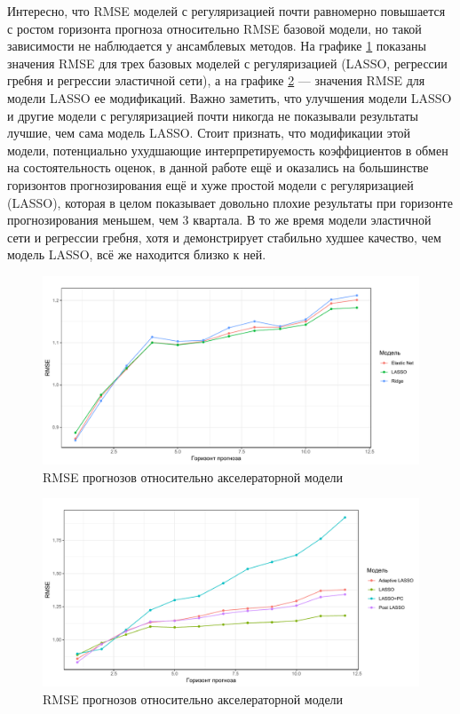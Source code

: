 Интересно, что RMSE моделей с регуляризацией почти равномерно повышается с ростом горизонта прогноза относительно RMSE базовой модели, но такой зависимости не наблюдается у ансамблевых методов. На графике \ref{fig:rmse1} показаны значения RMSE для трех базовых моделей с регуляризацией (LASSO, регрессии гребня и регрессии эластичной сети), а на графике \ref{fig:rmse2} --- значения RMSE для модели LASSO ее модификаций. Важно заметить, что улучшения модели LASSO и другие модели с регуляризацией почти никогда не показывали результаты лучшие, чем сама модель LASSO. Стоит признать, что модификации этой модели, потенциально ухудшающие интерпретируемость коэффициентов в обмен на состоятельность оценок, в данной работе ещё и оказались на большинстве горизонтов прогнозирования ещё и хуже простой модели с регуляризацией (LASSO), которая в целом показывает довольно плохие результаты при горизонте прогнозирования меньшем, чем 3 квартала.  В то же время модели эластичной сети и регрессии гребня, хотя и демонстрирует стабильно худшее качество, чем модель LASSO, всё же находится близко к ней.

\begin{figure}[h]
    \centering
    \includegraphics[width = \textwidth]{rmse1.pdf}
    \caption{RMSE прогнозов относительно акселераторной модели}
    \label{fig:rmse1}
\end{figure}


\begin{figure}[h]
    \centering
    \includegraphics[width = \textwidth]{rmse2.pdf}
    \caption{RMSE прогнозов относительно акселераторной модели}
    \label{fig:rmse2}
\end{figure}


